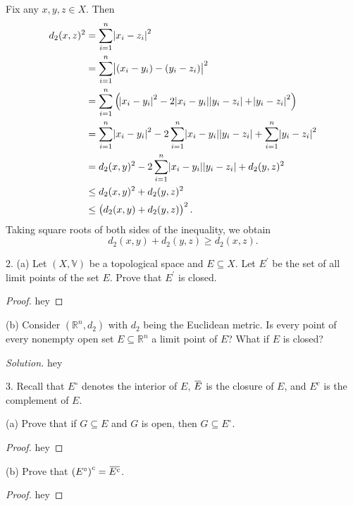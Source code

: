 \documentclass{article}
\newcommand{\R}{\mathbb{R}}
\newcommand{\V}{\mathbb{V}}
\newcommand*\clos[1]{\mkern 1.5mu\overline{\mkern-1.5mu#1\mkern-1.5mu}\mkern 1.5mu}
\begin{document}
Fix any $x, y, z \in X$. Then
%
\begin{align*}
    d_2(x, z)^2
        &= \sum_{i = 1}^n \envert{x_i - z_i}^2 \\
        &= \sum_{i = 1}^n \envert{(x_i - y_i) - (y_i - z_i)}^2 \\
        &= \sum_{i = 1}^n
            \del{
                \envert{x_i - y_i}^2
                - 2 \envert{x_i - y_i} \envert{y_i - z_i}
                + \envert{y_i - z_i}^2
            } \\
        &= \sum_{i = 1}^n \envert{x_i - y_i}^2
           - 2 \sum_{i = 1}^n \envert{x_i - y_i} \envert{y_i - z_i}
           + \sum_{i = 1}^n \envert{y_i - z_i}^2 \\
        &= d_2(x, y)^2
           - 2 \sum_{i = 1}^n \envert{x_i - y_i} \envert{y_i - z_i}
           + d_2(y, z)^2 \\
        &\leq d_2(x, y)^2 + d_2(y, z)^2 \\
        &\leq \del{d_2(x, y) + d_2(y, z)}^2
    .
\end{align*}
%
Taking square roots of both sides of the inequality, we obtain
%
\begin{equation*}
    d_2(x, y) + d_2(y, z) \geq d_2(x, z)
    .
\end{equation*}

\newpage

2. (a) Let $(X, \V)$ be a topological space and $E \subseteq X$. Let
   $E^\prime$ be the set of all limit points of the set $E$. Prove that
   $E^\prime$ is closed.

\begin{proof}

hey

\end{proof}

(b) Consider $(\R^n, d_2)$ with $d_2$ being the Euclidean metric. Is
every point of every nonempty open set $E \subseteq \R^n$ a limit point
of $E$? What if $E$ is closed?

\textit{Solution.}
hey

\newpage

3. Recall that $E^\circ$ denotes the interior of $E$, $\clos{E}$ is the
   closure of $E$, and $E^c$ is the complement of $E$.

(a) Prove that if $G \subseteq E$ and $G$ is open, then $G \subseteq
E^\circ$.

\begin{proof}

hey

\end{proof}

(b) Prove that $\del{E^\circ}^c = \clos{E^c}$.

\begin{proof}

hey

\end{proof}
\end{document}
